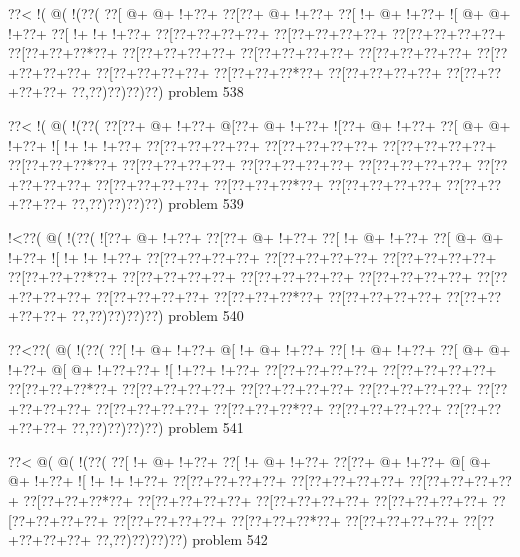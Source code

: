 \vbox{\vbox{\goo
\0??<\- !(\- @(\- !(\0??(
\0??[\- @+\- @+\- !+\0??+
\0??[\0??+\- @+\- !+\0??+
\0??[\- !+\- @+\- !+\0??+
\- ![\- @+\- @+\- !+\0??+
\0??[\- !+\- !+\- !+\0??+
\0??[\0??+\0??+\0??+\0??+
\0??[\0??+\0??+\0??+\0??+
\0??[\0??+\0??+\0??+\0??+
\0??[\0??+\0??+\0??*\0??+
\0??[\0??+\0??+\0??+\0??+
\0??[\0??+\0??+\0??+\0??+
\0??[\0??+\0??+\0??+\0??+
\0??[\0??+\0??+\0??+\0??+
\0??[\0??+\0??+\0??+\0??+
\0??[\0??+\0??+\0??*\0??+
\0??[\0??+\0??+\0??+\0??+
\0??[\0??+\0??+\0??+\0??+
\0??,\0??)\0??)\0??)\0??)
}
\hfil problem 538\hfil\break
}

\vbox{\vbox{\goo
\0??<\- !(\- @(\- !(\0??(
\0??[\0??+\- @+\- !+\0??+
\- @[\0??+\- @+\- !+\0??+
\- ![\0??+\- @+\- !+\0??+
\0??[\- @+\- @+\- !+\0??+
\- ![\- !+\- !+\- !+\0??+
\0??[\0??+\0??+\0??+\0??+
\0??[\0??+\0??+\0??+\0??+
\0??[\0??+\0??+\0??+\0??+
\0??[\0??+\0??+\0??*\0??+
\0??[\0??+\0??+\0??+\0??+
\0??[\0??+\0??+\0??+\0??+
\0??[\0??+\0??+\0??+\0??+
\0??[\0??+\0??+\0??+\0??+
\0??[\0??+\0??+\0??+\0??+
\0??[\0??+\0??+\0??*\0??+
\0??[\0??+\0??+\0??+\0??+
\0??[\0??+\0??+\0??+\0??+
\0??,\0??)\0??)\0??)\0??)
}
\hfil problem 539\hfil\break
}

\vbox{\vbox{\goo
\- !<\0??(\- @(\- !(\0??(
\- ![\0??+\- @+\- !+\0??+
\0??[\0??+\- @+\- !+\0??+
\0??[\- !+\- @+\- !+\0??+
\0??[\- @+\- @+\- !+\0??+
\- ![\- !+\- !+\- !+\0??+
\0??[\0??+\0??+\0??+\0??+
\0??[\0??+\0??+\0??+\0??+
\0??[\0??+\0??+\0??+\0??+
\0??[\0??+\0??+\0??*\0??+
\0??[\0??+\0??+\0??+\0??+
\0??[\0??+\0??+\0??+\0??+
\0??[\0??+\0??+\0??+\0??+
\0??[\0??+\0??+\0??+\0??+
\0??[\0??+\0??+\0??+\0??+
\0??[\0??+\0??+\0??*\0??+
\0??[\0??+\0??+\0??+\0??+
\0??[\0??+\0??+\0??+\0??+
\0??,\0??)\0??)\0??)\0??)
}
\hfil problem 540\hfil\break
}

\vbox{\vbox{\goo
\0??<\0??(\- @(\- !(\0??(
\0??[\- !+\- @+\- !+\0??+
\- @[\- !+\- @+\- !+\0??+
\0??[\- !+\- @+\- !+\0??+
\0??[\- @+\- @+\- !+\0??+
\- @[\- @+\- !+\0??+\0??+
\- ![\- !+\0??+\- !+\0??+
\0??[\0??+\0??+\0??+\0??+
\0??[\0??+\0??+\0??+\0??+
\0??[\0??+\0??+\0??*\0??+
\0??[\0??+\0??+\0??+\0??+
\0??[\0??+\0??+\0??+\0??+
\0??[\0??+\0??+\0??+\0??+
\0??[\0??+\0??+\0??+\0??+
\0??[\0??+\0??+\0??+\0??+
\0??[\0??+\0??+\0??*\0??+
\0??[\0??+\0??+\0??+\0??+
\0??[\0??+\0??+\0??+\0??+
\0??,\0??)\0??)\0??)\0??)
}
\hfil problem 541\hfil\break
}

\vbox{\vbox{\goo
\0??<\- @(\- @(\- !(\0??(
\0??[\- !+\- @+\- !+\0??+
\0??[\- !+\- @+\- !+\0??+
\0??[\0??+\- @+\- !+\0??+
\- @[\- @+\- @+\- !+\0??+
\- ![\- !+\- !+\- !+\0??+
\0??[\0??+\0??+\0??+\0??+
\0??[\0??+\0??+\0??+\0??+
\0??[\0??+\0??+\0??+\0??+
\0??[\0??+\0??+\0??*\0??+
\0??[\0??+\0??+\0??+\0??+
\0??[\0??+\0??+\0??+\0??+
\0??[\0??+\0??+\0??+\0??+
\0??[\0??+\0??+\0??+\0??+
\0??[\0??+\0??+\0??+\0??+
\0??[\0??+\0??+\0??*\0??+
\0??[\0??+\0??+\0??+\0??+
\0??[\0??+\0??+\0??+\0??+
\0??,\0??)\0??)\0??)\0??)
}
\hfil problem 542\hfil\break
}

